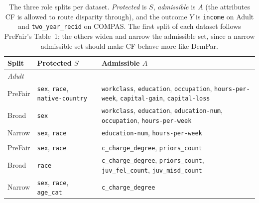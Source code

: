 \documentclass{article}
\begin{document}
\begin{table}[t]
  \caption{The three role splits per dataset. \emph{Protected} is $S$,
  \emph{admissible} is $A$ (the attributes CF is allowed to route disparity
  through), and the outcome $Y$ is \texttt{income} on Adult and
  \texttt{two\_year\_recid} on COMPAS. The first split of each dataset follows
  PreFair's Table~1; the others widen and narrow the admissible set, since a
  narrow admissible set should make CF behave more like DemPar.}
  \label{tab:roles}
  \centering
  \footnotesize
  \setlength{\tabcolsep}{4pt}
  \begin{tabular}{@{}l p{} p{}@{}}
    \toprule
    Split & Protected $S$ & Admissible $A$ \\
    \midrule
    \multicolumn{3}{l}{\textit{Adult}} \\
    PreFair       & \texttt{sex}, \texttt{race}, \texttt{native-country} & \texttt{workclass}, \texttt{education}, \texttt{occupation}, \texttt{hours-per-week}, \texttt{capital-gain}, \texttt{capital-loss} \\
    Broad         & \texttt{sex} & \texttt{workclass}, \texttt{education}, \texttt{education-num}, \texttt{occupation}, \texttt{hours-per-week} \\
    Narrow        & \texttt{sex}, \texttt{race} & \texttt{education-num}, \texttt{hours-per-week} \\
    \addlinespace[2pt]
    \multicolumn{3}{l}{\textit{COMPAS}} \\
    PreFair       & \texttt{sex}, \texttt{race} & \texttt{c\_charge\_degree}, \texttt{priors\_count} \\
    Broad         & \texttt{race} & \texttt{c\_charge\_degree}, \texttt{priors\_count}, \texttt{juv\_fel\_count}, \texttt{juv\_misd\_count} \\
    Narrow        & \texttt{sex}, \texttt{race}, \texttt{age\_cat} & \texttt{c\_charge\_degree} \\
    \bottomrule
  \end{tabular}
\end{table}
\end{document}
